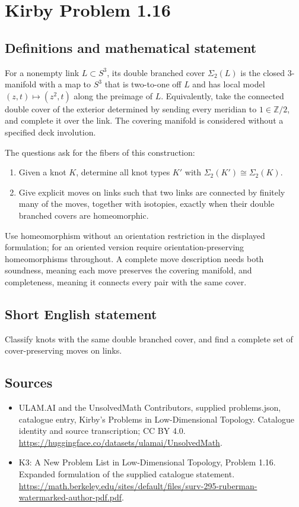 \documentclass[11pt,a4paper]{article}
\begin{document}
\section*{Kirby Problem 1.16}\label{statement}

\subsection{Definitions and mathematical statement}
For a nonempty link $L\subset S^3$, its double branched cover $\Sigma_2(L)$ is the
closed $3$-manifold with a map to $S^3$ that is two-to-one off $L$ and has local
model $(z,t)\mapsto(z^2,t)$ along the preimage of $L$.
Equivalently, take the connected double cover of the exterior determined by
sending every meridian to $1\in\mathbb Z/2$, and complete it over the link.
The covering manifold is considered without a specified deck involution.

The questions ask for the fibers of this construction:
\begin{enumerate}
\item Given a knot $K$, determine all knot types $K'$ with
$\Sigma_2(K')\cong\Sigma_2(K)$.
\item Give explicit moves on links such that two links are connected by finitely
many of the moves, together with isotopies, exactly when their double branched
covers are homeomorphic.
\end{enumerate}
Use homeomorphism without an orientation restriction in the displayed formulation;
for an oriented version require orientation-preserving homeomorphisms throughout.
A complete move description needs both soundness, meaning each move preserves
the covering manifold, and completeness, meaning it connects every pair with
the same cover.
\subsection{Short English statement}
Classify knots with the same double branched cover, and find a complete set of cover-preserving moves on links.
\subsection{Sources}
\begin{itemize}
\item[S1] ULAM.AI and the UnsolvedMath Contributors, supplied problems.json, catalogue entry, Kirby's Problems in Low-Dimensional Topology. Catalogue identity and source transcription; CC BY 4.0.
\url{https://huggingface.co/datasets/ulamai/UnsolvedMath}.
\item[S2] K3: A New Problem List in Low-Dimensional Topology, Problem 1.16. Expanded formulation of the supplied catalogue statement.
\url{https://math.berkeley.edu/sites/default/files/surv-295-ruberman-watermarked-author-pdf.pdf}.
\end{itemize}
\end{document}
